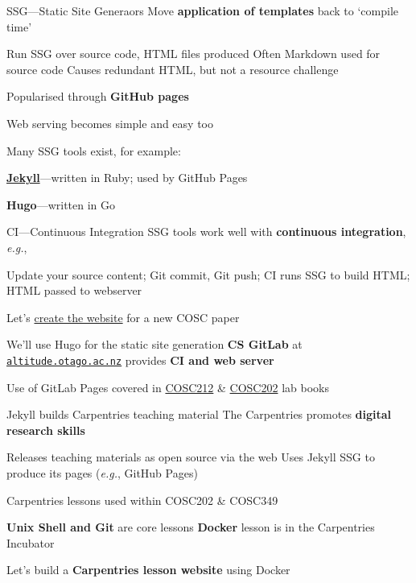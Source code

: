 \documentclass[aspectratio=169,t]{beamer}
\begin{document}
\begin{dframe}{SSG---Static Site Generaors}
  \1 Move \textbf{application of templates} back to `compile time'

  \2 Run SSG over source code, HTML files produced
  \2 Often Markdown used for source code
  \2 Causes redundant HTML, but not a resource challenge

  \1 Popularised through \textbf{GitHub pages}

  \2 Web serving becomes simple and easy too


  \1 Many SSG tools exist, for example:

  \2 \textbf{\href{http://jekyllrb.com}{Jekyll}}---written in Ruby; used by GitHub Pages

  \2 \textbf{Hugo}---written in Go
\end{dframe}

\begin{dframe}{CI---Continuous Integration}
  \1 SSG tools work well with \textbf{continuous integration}, \emph{e.g.}, 

  \2 Update your source content;
  \2 Git commit, Git push;
  \2 CI runs SSG to build HTML;
  \2 HTML passed to webserver
   
  \bigskip
  
  \1 Let's \href{https://altitude.otago.ac.nz/cosc312}{create the website} for a new COSC paper
  
  \2 We'll use Hugo for the static site generation
  \2 \textbf{CS GitLab} at \href{https://altitude.otago.ac.nz/}{\texttt{altitude.otago.ac.nz}} provides \textbf{CI and web server}
 
  \3 Use of GitLab Pages covered in \href{http://cosc212.cspages.otago.ac.nz/LabBook/LabBook.pdf}{COSC212} \& \href{http://cosc202.cspages.otago.ac.nz/lab-book/COSC202LabBook.pdf}{COSC202} lab books
\end{dframe}

\begin{dframe}{Jekyll builds Carpentries teaching material}
  \1 The Carpentries promotes \textbf{digital research skills}

  \2 Releases teaching materials as open source via the web
  \2 Uses Jekyll SSG to produce its pages (\emph{e.g.}, GitHub Pages)

  \bigskip

  \1 Carpentries lessons used within COSC202 \& COSC349
  
  \2 \textbf{Unix Shell and Git} are core lessons
  \2 \textbf{Docker} lesson is in the Carpentries Incubator
  
  \bigskip

  \1 Let's build a \textbf{Carpentries lesson website} using Docker
\end{dframe}
\end{document}
